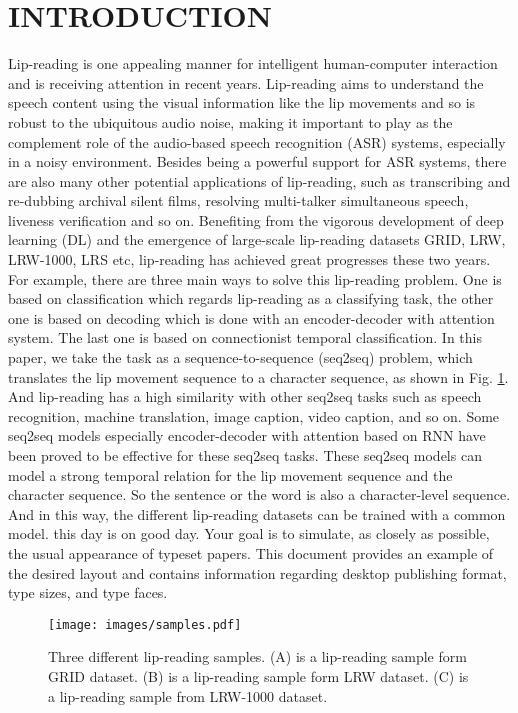 \documentclass[a4paper, 10pt, conference]{ieeeconf}      %
\begin{document}
\section{INTRODUCTION}
Lip-reading is one appealing manner for intelligent human-computer interaction and is receiving attention in recent years. 
Lip-reading aims to understand the speech content using the visual information\cite{B2017} 
like the lip movements and so is robust to the ubiquitous audio noise, making it important 
to play as the complement role of the audio-based speech recognition (ASR) systems, 
especially in a noisy environment. Besides being a powerful support for ASR systems, 
there are also many other potential applications of lip-reading, such as transcribing and 
re-dubbing archival silent films, resolving multi-talker simultaneous speech, liveness 
verification and so on\cite{Chung}. Benefiting from the vigorous development of deep 
learning (DL) and the emergence of large-scale lip-reading datasets GRID\cite{cooke2006}, 
LRW\cite{B2017}, LRW-1000\cite{Yang2019}, LRS\cite{Chung} etc, lip-reading has achieved 
great progresses these two years. For example, there are three main ways to solve this 
lip-reading problem. One is based on classification which regards lip-reading as a 
classifying task, the other one is based on decoding which is done with an encoder-decoder 
with attention system. The last one is based on connectionist temporal classification. 
In this paper, we take the task as a sequence-to-sequence (seq2seq) problem, 
which translates the lip movement sequence to a character sequence, as shown in 
Fig. \ref{figure0}. And lip-reading has a high similarity with other seq2seq tasks 
such as speech recognition\cite{Rohit}, machine translation\cite{IIya}, 
image caption\cite{Chen2017}, video caption\cite{Venugopalan}, and so on. Some seq2seq 
models especially encoder-decoder with attention based on RNN have been proved to be 
effective for these seq2seq tasks. These seq2seq models can model a strong temporal 
relation for the lip movement sequence and the character sequence. So the sentence or the 
word is also a character-level sequence. And in this way, the different lip-reading 
datasets can be trained with a common model.
this day is on good day. Your goal is to simulate, as closely as possible, the usual appearance of typeset
 papers. This document provides an example of the desired layout and contains
 information regarding desktop publishing format, type sizes, and type faces.

 \begin{figure}
	\setlength{\abovecaptionskip}{0.05cm}
	\setlength{\belowcaptionskip}{-0.4cm} 
	\centering
	\texttt{[image: images/samples.pdf]}
	\caption{Three different lip-reading samples. (A) is a lip-reading sample form GRID dataset. (B) is a lip-reading sample form LRW dataset. (C) is a lip-reading sample from LRW-1000 dataset.}\label{figure0}
\end{figure}
\end{document}
